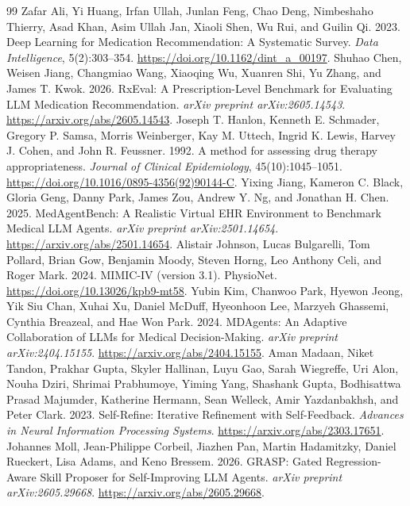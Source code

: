 \begin{thebibliography}{99}
 Zafar Ali, Yi Huang, Irfan Ullah, Junlan Feng, Chao Deng, Nimbeshaho Thierry, Asad Khan, Asim Ullah Jan, Xiaoli Shen, Wu Rui, and Guilin Qi. 2023. Deep Learning for Medication Recommendation: A Systematic Survey. \emph{Data Intelligence}, 5(2):303--354. \url{https://doi.org/10.1162/dint_a_00197}.
 Shuhao Chen, Weisen Jiang, Changmiao Wang, Xiaoqing Wu, Xuanren Shi, Yu Zhang, and James T. Kwok. 2026. RxEval: A Prescription-Level Benchmark for Evaluating LLM Medication Recommendation. \emph{arXiv preprint arXiv:2605.14543}. \url{https://arxiv.org/abs/2605.14543}.
 Joseph T. Hanlon, Kenneth E. Schmader, Gregory P. Samsa, Morris Weinberger, Kay M. Uttech, Ingrid K. Lewis, Harvey J. Cohen, and John R. Feussner. 1992. A method for assessing drug therapy appropriateness. \emph{Journal of Clinical Epidemiology}, 45(10):1045--1051. \url{https://doi.org/10.1016/0895-4356(92)90144-C}.
 Yixing Jiang, Kameron C. Black, Gloria Geng, Danny Park, James Zou, Andrew Y. Ng, and Jonathan H. Chen. 2025. MedAgentBench: A Realistic Virtual EHR Environment to Benchmark Medical LLM Agents. \emph{arXiv preprint arXiv:2501.14654}. \url{https://arxiv.org/abs/2501.14654}.
 Alistair Johnson, Lucas Bulgarelli, Tom Pollard, Brian Gow, Benjamin Moody, Steven Horng, Leo Anthony Celi, and Roger Mark. 2024. MIMIC-IV (version 3.1). PhysioNet. \url{https://doi.org/10.13026/kpb9-mt58}.
 Yubin Kim, Chanwoo Park, Hyewon Jeong, Yik Siu Chan, Xuhai Xu, Daniel McDuff, Hyeonhoon Lee, Marzyeh Ghassemi, Cynthia Breazeal, and Hae Won Park. 2024. MDAgents: An Adaptive Collaboration of LLMs for Medical Decision-Making. \emph{arXiv preprint arXiv:2404.15155}. \url{https://arxiv.org/abs/2404.15155}.
 Aman Madaan, Niket Tandon, Prakhar Gupta, Skyler Hallinan, Luyu Gao, Sarah Wiegreffe, Uri Alon, Nouha Dziri, Shrimai Prabhumoye, Yiming Yang, Shashank Gupta, Bodhisattwa Prasad Majumder, Katherine Hermann, Sean Welleck, Amir Yazdanbakhsh, and Peter Clark. 2023. Self-Refine: Iterative Refinement with Self-Feedback. \emph{Advances in Neural Information Processing Systems}. \url{https://arxiv.org/abs/2303.17651}.
 Johannes Moll, Jean-Philippe Corbeil, Jiazhen Pan, Martin Hadamitzky, Daniel Rueckert, Lisa Adams, and Keno Bressem. 2026. GRASP: Gated Regression-Aware Skill Proposer for Self-Improving LLM Agents. \emph{arXiv preprint arXiv:2605.29668}. \url{https://arxiv.org/abs/2605.29668}.

\end{thebibliography}
